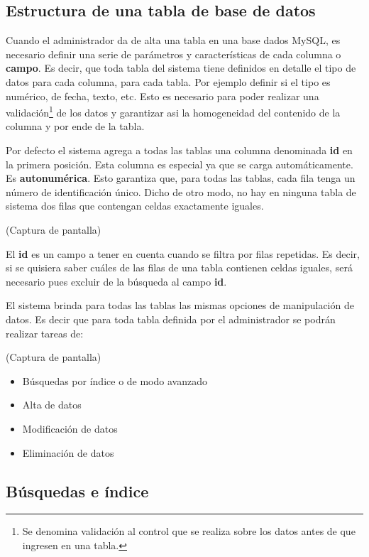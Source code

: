\documentclass[a4paper,10pt]{article}
\begin{document}
\subsection{Estructura de una tabla de base de datos}

Cuando el administrador da de alta una tabla en una base dados MySQL, es necesario definir una serie de parámetros y características de cada columna o \textbf{campo}. Es decir, que toda tabla del sistema tiene definidos en detalle el tipo de datos para cada columna, para cada tabla. Por ejemplo definir si el tipo es numérico, de fecha, texto, etc. Esto es necesario para poder realizar una validación\footnote{Se denomina validación al control que se realiza sobre los datos antes de que ingresen en una tabla.} de los datos y garantizar asi la homogeneidad del contenido de la columna y por ende de la tabla.

Por defecto el sistema agrega a todas las tablas una columna denominada \textbf{id} en la primera posición. Esta columna es especial ya que se carga automáticamente. Es \textbf{autonumérica}. Esto garantiza que, para todas las tablas, cada fila tenga un número de identificación único. Dicho de otro modo, no hay en ninguna tabla de sistema dos filas que contengan celdas exactamente iguales.

(Captura de pantalla)

El \textbf{id} es un campo a tener en cuenta cuando se filtra por filas repetidas. Es decir, si se quisiera saber cuáles de las filas de una tabla contienen celdas iguales, será necesario pues excluir de la búsqueda al campo \textbf{id}.

El sistema brinda para todas las tablas las mismas opciones de manipulación de datos. Es decir que para toda tabla definida por el administrador se podrán realizar tareas de:

(Captura de pantalla)

\begin{itemize}
 \item Búsquedas por índice o de modo avanzado
 \item Alta de datos
 \item Modificación de datos 
 \item Eliminación de datos
\end{itemize}

\subsection{Búsquedas e índice}
\end{document}
